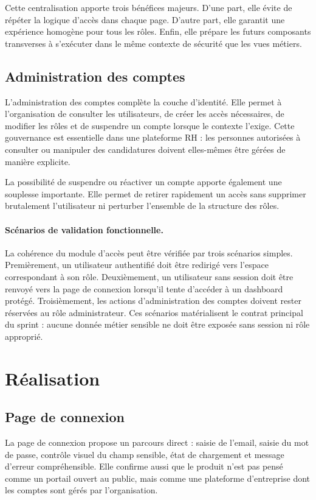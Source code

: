 Cette centralisation apporte trois bénéfices majeurs. D'une part, elle évite de répéter la logique d'accès dans chaque page. D'autre part, elle garantit une expérience homogène pour tous les rôles. Enfin, elle prépare les futurs composants transverses à s'exécuter dans le même contexte de sécurité que les vues métiers.

\subsection{Administration des comptes}
L'administration des comptes complète la couche d'identité. Elle permet à l'organisation de consulter les utilisateurs, de créer les accès nécessaires, de modifier les rôles et de suspendre un compte lorsque le contexte l'exige. Cette gouvernance est essentielle dans une plateforme RH : les personnes autorisées à consulter ou manipuler des candidatures doivent elles-mêmes être gérées de manière explicite.

La possibilité de suspendre ou réactiver un compte apporte également une souplesse importante. Elle permet de retirer rapidement un accès sans supprimer brutalement l'utilisateur ni perturber l'ensemble de la structure des rôles.

\paragraph{Scénarios de validation fonctionnelle.}
La cohérence du module d'accès peut être vérifiée par trois scénarios simples. Premièrement, un utilisateur authentifié doit être redirigé vers l'espace correspondant à son rôle. Deuxièmement, un utilisateur sans session doit être renvoyé vers la page de connexion lorsqu'il tente d'accéder à un dashboard protégé. Troisièmement, les actions d'administration des comptes doivent rester réservées au rôle administrateur. Ces scénarios matérialisent le contrat principal du sprint : aucune donnée métier sensible ne doit être exposée sans session ni rôle approprié.

\section{Réalisation}


\subsection{Page de connexion}
La page de connexion propose un parcours direct : saisie de l'email, saisie du mot de passe, contrôle visuel du champ sensible, état de chargement et message d'erreur compréhensible. Elle confirme aussi que le produit n'est pas pensé comme un portail ouvert au public, mais comme une plateforme d'entreprise dont les comptes sont gérés par l'organisation.

